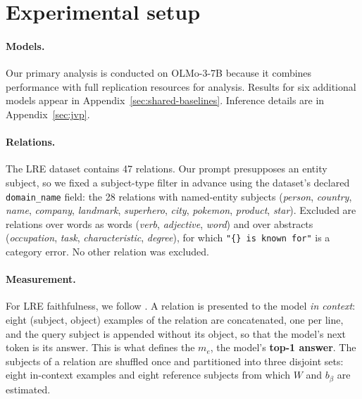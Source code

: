 \documentclass{article}
\begin{document}


\section{Experimental setup}
\label{sec:setup}

\paragraph{Models.} Our primary analysis is conducted on OLMo-3-7B because it combines performance with full replication resources for analysis. Results for six additional models appear in Appendix~\ref{sec:shared-baselines}. Inference details are in Appendix~\ref{sec:jvp}.

\paragraph{Relations.} The LRE dataset \citep{hernandez2024linearity}
contains 47 relations. Our prompt presupposes an entity subject, so we
fixed a subject-type filter in advance using the dataset's declared
\texttt{domain\_name} field: the 28 relations with named-entity subjects
(\textit{person}, \textit{country}, \textit{name}, \textit{company},
\textit{landmark}, \textit{superhero}, \textit{city}, \textit{pokemon},
\textit{product}, \textit{star}). Excluded are relations over words as
words (\textit{verb}, \textit{adjective}, \textit{word}) and over abstracts
(\textit{occupation}, \textit{task}, \textit{characteristic},
\textit{degree}), for which \texttt{"\{\} is known for"} is a category
error. No other relation was excluded.



\paragraph{Measurement.}
For LRE faithfulness,
we follow
\citet{hernandez2024linearity}. A relation is presented to the model
\emph{in context}: eight (subject, object) examples of the relation are
concatenated, one per line, and the query subject is appended without its
object, so that the model's next token is its answer.
This is what
defines the $m_e$, the model's \textbf{top-1 answer}. The subjects of
a relation are shuffled once and partitioned into three disjoint sets:
eight in-context examples and eight reference subjects from which $W$ and $b_\beta$
are estimated.
\end{document}
